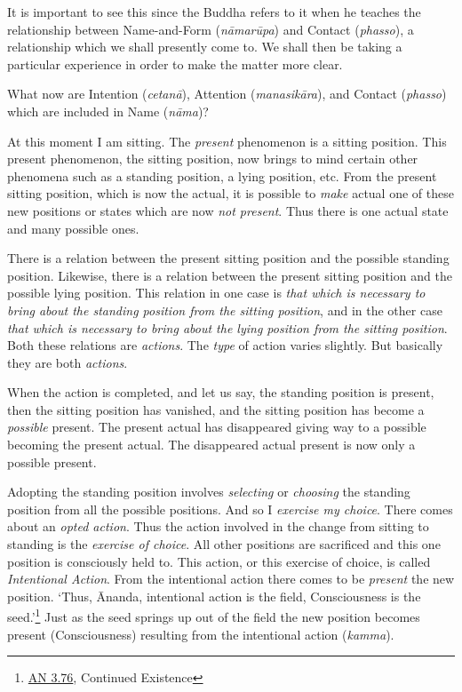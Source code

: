 It is important to see this since the Buddha refers to it when he teaches the relationship between Name-and-Form (\textit{nāmarūpa}) and Contact (\textit{phasso}), a relationship which we shall presently come to. We shall then be taking a particular experience in order to make the matter more clear.

What now are Intention (\textit{cetanā}), Attention (\textit{manasikāra}), and Contact (\textit{phasso}) which are included in Name (\textit{nāma})?

At this moment I am sitting. The \emph{present} phenomenon is a sitting position. This present phenomenon, the sitting position, now brings to mind certain other phenomena such as a standing position, a lying position, etc. From the present sitting position, which is now the actual, it is possible to \emph{make} actual one of these new positions or states which are now \emph{not present}. Thus there is one actual state and many possible ones.

There is a relation between the present sitting position and the possible standing position. Likewise, there is a relation between the present sitting position and the possible lying position. This relation in one case is \emph{that which is necessary to bring about the standing position from the sitting position}, and in the other case \emph{that which is necessary to bring about the lying position from the sitting position}. Both these relations are \emph{actions}. The \emph{type} of action varies slightly. But basically they are both \emph{actions}.

When the action is completed, and let us say, the standing position is present, then the sitting position has vanished, and the sitting position has become a \emph{possible} present. The present actual has disappeared giving way to a possible becoming the present actual. The disappeared actual present is now only a possible present.

Adopting the standing position involves \emph{selecting} or \emph{choosing} the standing position from all the possible positions. And so I \emph{exercise my choice}. There comes about an \emph{opted action}. Thus the action involved in the change from sitting to standing is the \emph{exercise of choice}. All other positions are sacrificed and this one position is consciously held to. This action, or this exercise of choice, is called \emph{Intentional Action}. From the intentional action there comes to be \emph{present} the new position. `Thus, Ānanda, intentional action is the field, Consciousness is the seed.'\footnote{\href{https://suttacentral.net/an3.76/en/thanissaro}{AN 3.76}, Continued Existence} Just as the seed springs up out of the field the new position becomes present (Consciousness) resulting from the intentional action (\textit{kamma}).

